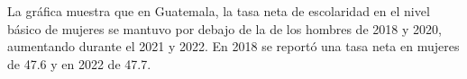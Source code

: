 La gráfica muestra que en Guatemala, la tasa neta de escolaridad en el nivel básico de
mujeres se mantuvo por debajo de la de los hombres de 2018 y 2020, aumentando durante el 2021 y 2022. En 2018 se reportó una tasa neta en mujeres de 47.6 y en 2022 de 47.7.